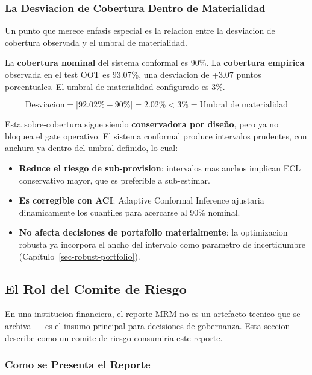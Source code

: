 \documentclass[
  spanish,
  11pt,
  letterpaper,
]{scrbook}
\providecommand{\tightlist}{%
  \setlength{\itemsep}{0pt}\setlength{\parskip}{0pt}}
\theoremstyle{plain}
\theoremstyle{remark}
\begin{document}
\subsubsection{La Desviacion de Cobertura Dentro de
Materialidad}\label{la-desviacion-de-cobertura-dentro-de-materialidad}

Un punto que merece enfasis especial es la relacion entre la desviacion
de cobertura observada y el umbral de materialidad.

La \textbf{cobertura nominal} del sistema conformal es 90\%. La
\textbf{cobertura empirica} observada en el test OOT es 93.07\%, una
desviacion de +3.07 puntos porcentuales. El umbral de materialidad
configurado es 3\%.

\[
\text{Desviacion} = |92.02\% - 90\%| = 2.02\% < 3\% = \text{Umbral de materialidad}
\]

Esta sobre-cobertura sigue siendo \textbf{conservadora por diseño}, pero
ya no bloquea el gate operativo. El sistema conformal produce intervalos
prudentes, con anchura ya dentro del umbral definido, lo cual:

\begin{itemize}
\tightlist
\item
  \textbf{Reduce el riesgo de sub-provision}: intervalos mas anchos
  implican ECL conservativo mayor, que es preferible a sub-estimar.
\item
  \textbf{Es corregible con ACI}: Adaptive Conformal Inference ajustaria
  dinamicamente los cuantiles para acercarse al 90\% nominal.
\item
  \textbf{No afecta decisiones de portafolio materialmente}: la
  optimizacion robusta ya incorpora el ancho del intervalo como
  parametro de incertidumbre (Capítulo~\ref{sec-robust-portfolio}).
\end{itemize}

\subsection{El Rol del Comite de Riesgo}\label{sec-mrm-risk-committee}

En una institucion financiera, el reporte MRM no es un artefacto tecnico
que se archiva --- es el insumo principal para decisiones de gobernanza.
Esta seccion describe como un comite de riesgo consumiria este reporte.

\subsubsection{Como se Presenta el
Reporte}\label{como-se-presenta-el-reporte}
\end{document}
